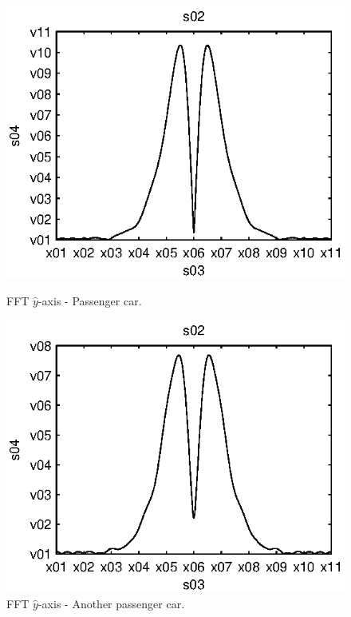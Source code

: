 
\begin{subfigures}
\begin{figure}[tfhb]
 \centering
 \begin{minipage}{0.45\linewidth}
 	\centering
 	
	\includegraphics[width=1\linewidth]{images/fft-car-y}
  	\caption[FFT $\hat{y}$-axis - Passenger car]{FFT $\hat{y}$-axis - Passenger car.\\}
  	\label{fig:fft-car-y} 
 \end{minipage} \hfill
 \begin{minipage}{0.45\linewidth}
 	\centering
  	
	\includegraphics[width=1\linewidth]{images/fft-car3-y}
  	\caption[FFT $\hat{y}$-axis - Another passenger car]{FFT $\hat{y}$-axis - Another passenger car.}
  	\label{fig:fft-car3-y} 
 \end{minipage}
   

\end{figure}
\end{subfigures}
